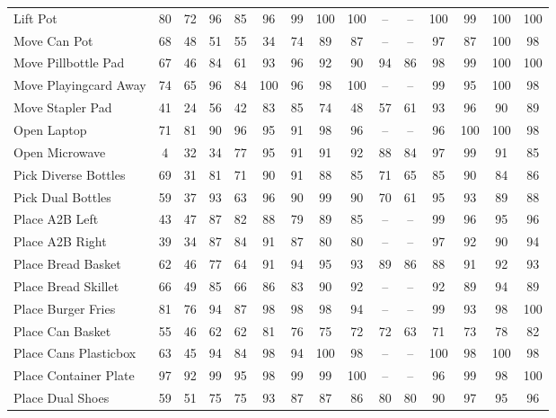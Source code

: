 \begin{table}[tp]
{\begin{tabular}{l*{14}{c}}
        Lift Pot                    & 80 & 72 & 96 & 85 & 96 & 99 & 100 & 100 & -- & -- & 100 & 99 & 100 & 100 \\
        Move Can Pot                & 68 & 48 & 51 & 55 & 34 & 74 & 89 & 87 & -- & -- & 97 & 87 & 100 & 98 \\
        Move Pillbottle Pad         & 67 & 46 & 84 & 61 & 93 & 96 & 92 & 90 & 94 & 86 & 98 & 99 & 100 & 100 \\
        Move Playingcard Away       & 74 & 65 & 96 & 84 & 100 & 96 & 98 & 100 & -- & -- & 99 & 95 & 100 & 98 \\
        Move Stapler Pad            & 41 & 24 & 56 & 42 & 83 & 85 & 74 & 48 & 57 & 61 & 93 & 96 & 90 & 89 \\
        Open Laptop                 & 71 & 81 & 90 & 96 & 95 & 91 & 98 & 96 & -- & -- & 96 & 100 & 100 & 98 \\
        Open Microwave              & 4 & 32 & 34 & 77 & 95 & 91 & 91 & 92 & 88 & 84 & 97 & 99 & 91 & 85 \\
        Pick Diverse Bottles        & 69 & 31 & 81 & 71 & 90 & 91 & 88 & 85 & 71 & 65 & 85 & 90 & 84 & 86 \\
        Pick Dual Bottles           & 59 & 37 & 93 & 63 & 96 & 90 & 99 & 90 & 70 & 61 & 95 & 93 & 89 & 88 \\
        Place A2B Left              & 43 & 47 & 87 & 82 & 88 & 79 & 89 & 85 & -- & -- & 99 & 96 & 95 & 96 \\
        Place A2B Right             & 39 & 34 & 87 & 84 & 91 & 87 & 80 & 80 & -- & -- & 97 & 92 & 90 & 94 \\
        Place Bread Basket          & 62 & 46 & 77 & 64 & 91 & 94 & 95 & 93 & 89 & 86 & 88 & 91 & 92 & 93 \\
        Place Bread Skillet         & 66 & 49 & 85 & 66 & 86 & 83 & 90 & 92 & -- & -- & 92 & 89 & 94 & 89 \\
        Place Burger Fries          & 81 & 76 & 94 & 87 & 98 & 98 & 98 & 94 & -- & -- & 99 & 93 & 98 & 100 \\
        Place Can Basket            & 55 & 46 & 62 & 62 & 81 & 76 & 75 & 72 & 72 & 63 & 71 & 73 & 78 & 82 \\
        Place Cans Plasticbox       & 63 & 45 & 94 & 84 & 98 & 94 & 100 & 98 & -- & -- & 100 & 98 & 100 & 98 \\
        Place Container Plate       & 97 & 92 & 99 & 95 & 98 & 99 & 99 & 100 & -- & -- & 96 & 99 & 98 & 100 \\
        Place Dual Shoes            & 59 & 51 & 75 & 75 & 93 & 87 & 87 & 86 & 80 & 80 & 90 & 97 & 95 & 96 \\

\end{tabular}}
\end{table}
